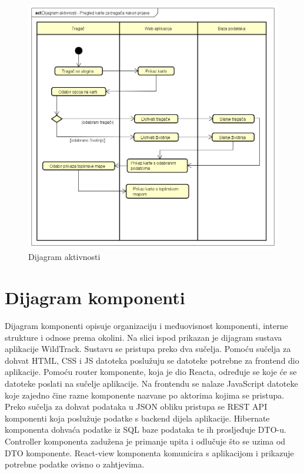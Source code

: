 			\begin{figure}[H]
				\includegraphics[scale=0.6]{slike/dijagram_aktivnosti.PNG} %
				\centering
				\caption{Dijagram aktivnosti}
				\label{fig:promjene}
			\end{figure}
			
			\eject
		\section{Dijagram komponenti}
		
			\noindent Dijagram komponenti opisuje organizaciju i međuovisnost komponenti, interne strukture i odnose prema okolini. Na slici ispod prikazan je dijagram sustava aplikacije WildTrack. Sustavu se pristupa preko dva sučelja. Pomoću sučelja za dohvat HTML, CSS i JS datoteka poslužuju se datoteke potrebne za frontend dio aplikacije. Pomoću router komponente, koja je dio Reacta, određuje se koje će se datoteke poslati na sučelje aplikacije.  Na frontendu se nalaze JavaScript datoteke koje zajedno čine razne komponente nazvane po aktorima kojima se pristupa. Preko sučelja za dohvat podataka u JSON obliku pristupa se REST API komponenti koja poslužuje podatke s backend dijela aplikacije. Hibernate komponenta dohvaća podatke iz SQL baze podataka te ih prosljeđuje DTO-u. Controller komponenta zadužena je primanje upita i odlučuje što se uzima od DTO komponente. React-view komponenta komunicira s aplikacijom i prikazuje potrebne podatke ovisno o zahtjevima.
			
